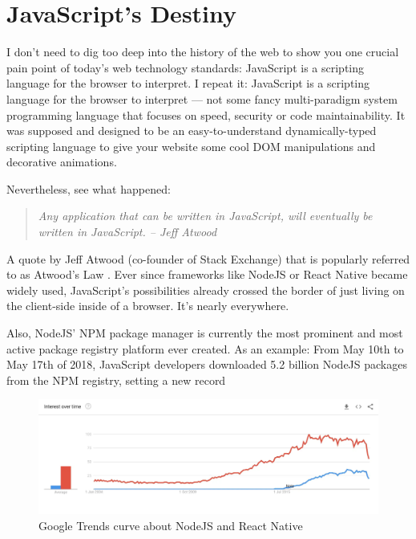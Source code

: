 \documentclass[11pt]{article}
\begin{document}
\section{JavaScript’s Destiny}
\label{sec:javascript-destiny}

I don’t need to dig too deep into the history of the web to show you one crucial pain point of today’s web technology standards: JavaScript is a scripting language for the browser to interpret. I repeat it: JavaScript is a scripting language for the browser to interpret — not some fancy multi-paradigm system programming language that focuses on speed, security or code maintainability. It was supposed and designed to be an easy-to-understand dynamically-typed scripting language to give your website some cool DOM manipulations and decorative animations.

Nevertheless, see what happened:

\begin{quote}
  \emph{Any application that can be written in JavaScript, will eventually be written in JavaScript. – Jeff Atwood}
\end{quote}

A quote by Jeff Atwood (co-founder of Stack Exchange) that is popularly referred to as Atwood’s Law \citep{atwood_principle_2007}. Ever since frameworks like NodeJS or React Native became widely used, JavaScript’s possibilities already crossed the border of just living on the client-side inside of a browser. It’s nearly everywhere.

Also, NodeJS’ NPM package manager is currently the most prominent and most active package registry platform ever created. As an example: From May 10th to May 17th of 2018, JavaScript developers downloaded 5.2 billion NodeJS packages from the NPM registry, setting a new record \citep{npm_inc_how_2018}

\begin{figure}[ht]
  \centering
  \includegraphics[width=\textwidth]{figures/003.jpg}
  \caption{Google Trends curve about NodeJS and React Native}
  \label{fig:atwood-law}
\end{figure}
\end{document}
